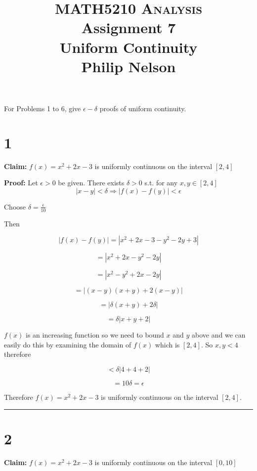\documentclass[10pt,letterpaper]{article}
\newcommand\qedsym{\hfill \rule{2mm}{2mm}}
\begin{document}
\title{MATH5210 \textsc{Analysis}
  \\ Assignment 7
  \\ Uniform Continuity
  \\ Philip Nelson
}

\date{}

\maketitle
For Problems 1 to 6, give $\epsilon - \delta$ proofs of uniform continuity.
\section*{1}

\textbf{Claim:} $f(x) = x^2 + 2x -3$ is uniformly continuous on the interval $[2,4]$

\medskip

\textbf{Proof:} Let $\epsilon > 0$ be given. There exists $\delta > 0$ s.t. for any $x, y \in [2,4]$ \[|x-y| < \delta \Rightarrow |f(x) - f(y)| < \epsilon\]

Choose $\delta = \frac{\epsilon}{10}$

Then

\[|f(x)-f(y)| = |x^2 + 2x - 3 - y^2 - 2y + 3|\]

\[= |x^2 + 2x - y^2 - 2y|\]

\[= |x^2 - y^2 + 2x - 2y|\]

\[= |(x-y)(x+y) + 2(x-y)|\]

\[= |\delta(x+y) + 2\delta|\]

\[= \delta|x + y + 2|\]

$f(x)$ is an increasing function so we need to bound $x$ and $y$ above and we can easily do this by examining the domain of $f(x)$ which is $[2,4]$. So $x,y < 4$ therefore 

\[<\delta|4+4+2|\]

\[=10\delta = \epsilon\]

Therefore $f(x) = x^2 + 2x -3$ is uniformly continuous on the interval $[2,4]$.

\qedsym

\section*{2}

\textbf{Claim:} $f(x) = x^2 + 2x -3$ is uniformly continuous on the interval $[0,10]$

\medskip
\end{document}
